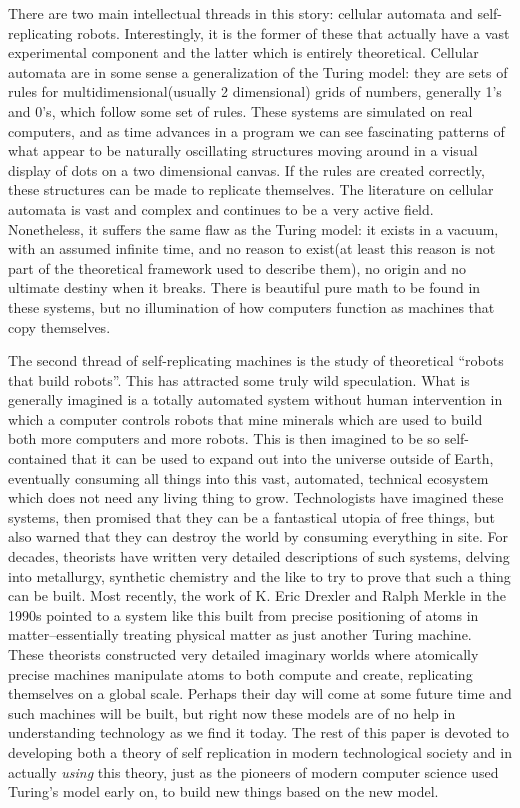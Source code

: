 \documentclass[12pt,a4paper]{amsart}
\numberwithin{equation}{section}
\begin{document}
There are two main intellectual threads in this story: cellular automata
and self-replicating robots. Interestingly, it is the former of these
that actually have a vast experimental component and the latter which is
entirely theoretical. Cellular automata are in some sense a
generalization of the Turing model: they are sets of rules for
multidimensional(usually 2 dimensional) grids of numbers, generally 1's
and 0's, which follow some set of rules. These systems are simulated on
real computers, and as time advances in a program we can see fascinating
patterns of what appear to be naturally oscillating structures moving
around in a visual display of dots on a two dimensional canvas. If the
rules are created correctly, these structures can be made to replicate
themselves. The literature on cellular automata is vast and complex and
continues to be a very active field. Nonetheless, it suffers the same
flaw as the Turing model: it exists in a vacuum, with an assumed
infinite time, and no reason to exist(at least this reason is not part
of the theoretical framework used to describe them), no origin and no
ultimate destiny when it breaks. There is beautiful pure math to be
found in these systems, but no illumination of how computers function as
machines that copy themselves.

The second thread of self-replicating machines is the study of
theoretical ``robots that build robots''. This has attracted some truly
wild speculation. What is generally imagined is a totally automated
system without human intervention in which a computer controls robots
that mine minerals which are used to build both more computers and more
robots. This is then imagined to be so self-contained that it can be
used to expand out into the universe outside of Earth, eventually
consuming all things into this vast, automated, technical ecosystem
which does not need any living thing to grow. Technologists have
imagined these systems, then promised that they can be a fantastical
utopia of free things, but also warned that they can destroy the world
by consuming everything in site. For decades, theorists have written
very detailed descriptions of such systems, delving into metallurgy,
synthetic chemistry and the like to try to prove that such a thing can
be built. Most recently, the work of K. Eric Drexler and Ralph Merkle in
the 1990s pointed to a system like this built from precise positioning
of atoms in matter--essentially treating physical matter as just another
Turing machine. These theorists constructed very detailed imaginary
worlds where atomically precise machines manipulate atoms to both
compute and create, replicating themselves on a global scale. Perhaps
their day will come at some future time and such machines will be built,
but right now these models are of no help in understanding technology as
we find it today. The rest of this paper is devoted to developing both a
theory of self replication in modern technological society and in
actually \emph{using} this theory, just as the pioneers of modern
computer science used Turing's model early on, to build new things based
on the new model.
\end{document}
